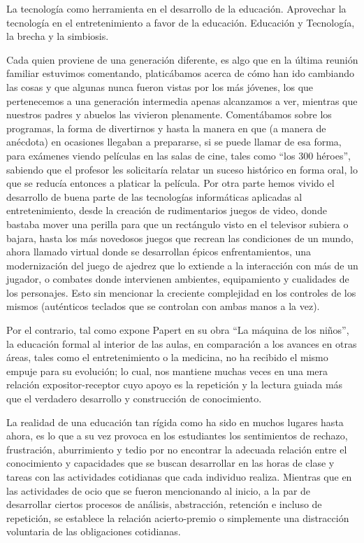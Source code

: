 La tecnología como herramienta en el desarrollo de la educación.
Aprovechar la tecnología en el entretenimiento a favor de la educación.
Educación y Tecnología, la brecha y la simbiosis.

Cada quien proviene de una generación diferente, es algo que en la última reunión familiar estuvimos comentando, platicábamos acerca de cómo han ido cambiando las cosas y que algunas nunca fueron vistas por los más jóvenes, los que pertenecemos a una generación intermedia apenas alcanzamos a ver, mientras que nuestros padres y abuelos las vivieron plenamente. Comentábamos sobre los programas, la forma de divertirnos y hasta la manera en que (a manera de anécdota) en ocasiones llegaban a prepararse, si se puede llamar de esa forma, para exámenes viendo películas en las salas de cine, tales como “los 300 héroes”, sabiendo que el profesor les solicitaría relatar un suceso histórico en forma oral, lo que se reducía entonces a platicar la película. Por otra parte hemos vivido el desarrollo de buena parte de las tecnologías informáticas aplicadas al entretenimiento, desde la creación de rudimentarios juegos de video, donde bastaba mover una perilla para que un rectángulo visto en el televisor subiera o bajara, hasta los más novedosos juegos que recrean las condiciones de un mundo, ahora llamado virtual donde se desarrollan épicos enfrentamientos, una modernización del juego de ajedrez que lo extiende a la interacción con más de un jugador, o combates donde intervienen ambientes, equipamiento y cualidades de los personajes. Esto sin mencionar la creciente complejidad en los controles de los mismos (auténticos teclados que se controlan con ambas manos a la vez).

Por el contrario, tal como expone Papert en su obra “La máquina de los niños”, la educación formal al interior de las aulas, en comparación a los avances en otras áreas, tales como el entretenimiento o la medicina, no ha recibido el mismo empuje para su evolución; lo cual, nos mantiene muchas veces en una mera relación expositor-receptor cuyo apoyo es la repetición y la lectura guiada más que el verdadero desarrollo y construcción de conocimiento.

La realidad de una educación tan rígida como ha sido en muchos lugares hasta ahora, es lo que a su vez provoca en los estudiantes los sentimientos de rechazo, frustración, aburrimiento y tedio por no encontrar la adecuada relación entre el conocimiento y capacidades que se buscan desarrollar en las horas de clase y tareas con las actividades cotidianas que cada individuo realiza. Mientras que en las actividades de ocio que se fueron mencionando al inicio, a la par de desarrollar ciertos procesos de análisis, abstracción, retención e incluso de repetición, se establece la relación acierto-premio o simplemente una distracción voluntaria de las obligaciones cotidianas.

